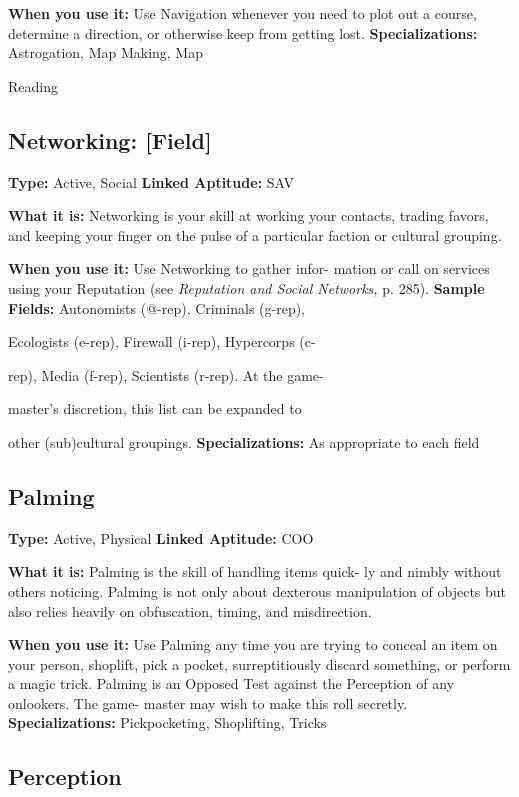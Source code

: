 \textbf{When you use it:} Use Navigation whenever you 
need to plot out a course, determine a direction, or 
otherwise keep from getting lost.
\textbf{Specializations:} Astrogation, Map Making, Map 

Reading

\subsection{Networking: [Field]}

\textbf{Type:} Active, Social
\textbf{Linked Aptitude:} SAV

\textbf{What it is:} Networking is your skill at working your 
contacts, trading favors, and keeping your finger on 
the pulse of a particular faction or cultural grouping.

\textbf{When you use it:} Use Networking to gather infor-
mation or call on services using your Reputation (see 
\textit{Reputation and Social Networks,} p. 285).
\textbf{Sample Fields:} Autonomists (@-rep), Criminals (g-rep), 

Ecologists (e-rep), Firewall (i-rep), Hypercorps (c-

rep), Media (f-rep), Scientists (r-rep). At the game-

master's discretion, this list can be expanded to 

other (sub)cultural groupings.
\textbf{Specializations:} As appropriate to each field

\subsection{Palming}

\textbf{Type:} Active, Physical
\textbf{Linked Aptitude:} COO

\textbf{What it is:} Palming is the skill of handling items quick-
ly and nimbly without others noticing. Palming is not 
only about dexterous manipulation of objects but also 
relies heavily on obfuscation, timing, and misdirection.

\textbf{When you use it:} Use Palming any time you are 
trying to conceal an item on your person, shoplift, 
pick a pocket, surreptitiously discard something, or 
perform a magic trick. Palming is an Opposed Test 
against the Perception of any onlookers. The game-
master may wish to make this roll secretly.
\textbf{Specializations:} Pickpocketing, Shoplifting, Tricks

\subsection{Perception}

